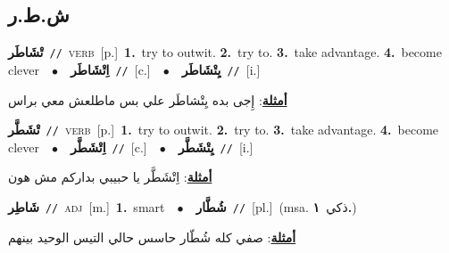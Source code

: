 \documentclass[10pt,a4paper,twoside]{article} %
\begin{document}
\begin{multicols}{2}
\vspace{-3mm}
\subsection*{\color{blue}\foreignlanguage{arabic}{ش.ط.ر}\color{blue}{}} 

{\setlength\topsep{0pt}\textbf{\foreignlanguage{arabic}{تْشَاطَر}}\ {\color{gray}\texttt{//}\color{black}}\ \textsc{verb}\ [p.]\ \textbf{1.}~try to outwit.  \textbf{2.}~try to.  \textbf{3.}~take advantage.  \textbf{4.}~become clever\ \ $\bullet$\ \ \setlength\topsep{0pt}\textbf{\foreignlanguage{arabic}{اِتْشَاطَر}}\ {\color{gray}\texttt{//}\color{black}}\ [c.]\ \ $\bullet$\ \ \setlength\topsep{0pt}\textbf{\foreignlanguage{arabic}{يِتْشَاطَر}}\ {\color{gray}\texttt{//}\color{black}}\ [i.]\  \begin{flushright}\color{gray}\foreignlanguage{arabic}{\textbf{\underline{\foreignlanguage{arabic}{أمثلة}}}: إِجى بده يِتْشاطَر علي بس ماطلعش معي براس}\end{flushright}\color{black}} \vspace{2mm}

{\setlength\topsep{0pt}\textbf{\foreignlanguage{arabic}{تْشَطَّر}}\ {\color{gray}\texttt{//}\color{black}}\ \textsc{verb}\ [p.]\ \textbf{1.}~try to outwit.  \textbf{2.}~try to.  \textbf{3.}~take advantage.  \textbf{4.}~become clever\ \ $\bullet$\ \ \setlength\topsep{0pt}\textbf{\foreignlanguage{arabic}{اِتْشَطَّر}}\ {\color{gray}\texttt{//}\color{black}}\ [c.]\ \ $\bullet$\ \ \setlength\topsep{0pt}\textbf{\foreignlanguage{arabic}{يِتْشَطَّر}}\ {\color{gray}\texttt{//}\color{black}}\ [i.]\  \begin{flushright}\color{gray}\foreignlanguage{arabic}{\textbf{\underline{\foreignlanguage{arabic}{أمثلة}}}: اِتْشَطَّر يا حبيبي بداركم مش هون}\end{flushright}\color{black}} \vspace{2mm}

{\setlength\topsep{0pt}\textbf{\foreignlanguage{arabic}{شَاطِر}}\ {\color{gray}\texttt{//}\color{black}}\ \textsc{adj}\ [m.]\ \textbf{1.}~smart\ \ $\bullet$\ \ \setlength\topsep{0pt}\textbf{\foreignlanguage{arabic}{شُطَّار}}\ {\color{gray}\texttt{//}\color{black}}\ [pl.]\ \color{gray}(msa. \foreignlanguage{arabic}{ذكي}~\foreignlanguage{arabic}{\textbf{١.}})\color{black}\  \begin{flushright}\color{gray}\foreignlanguage{arabic}{\textbf{\underline{\foreignlanguage{arabic}{أمثلة}}}: صفي كله شُطّار حاسس حالي التيس الوحيد بينهم}\end{flushright}\color{black}} \vspace{2mm}


\end{multicols}
\end{document}
